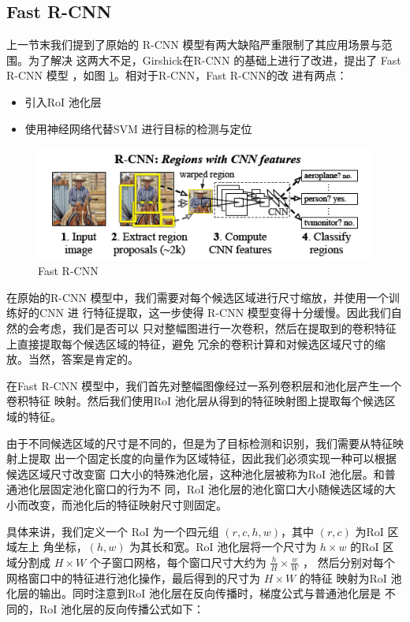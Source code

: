 \subsection{Fast R-CNN}

上一节末我们提到了原始的 R-CNN 模型有两大缺陷严重限制了其应用场景与范围。为了解决
这两大不足，Girshick在R-CNN 的基础上进行了改进，提出了 Fast R-CNN 模型
\cite{Girshick:2015ib}，如图 \ref{Fig:FastRCNN}。相对于R-CNN，Fast R-CNN的改
进有两点：

\begin{itemize}
  \item 引入RoI 池化层
  \item 使用神经网络代替SVM 进行目标的检测与定位
\end{itemize}

\begin{figure}
  \centering
  \includegraphics[width=1.0\linewidth]{./Figure/FastRCNN.png}
  \caption{Fast R-CNN\cite{Girshick:2015ib}}\label{Fig:FastRCNN}
\end{figure}

在原始的R-CNN 模型中，我们需要对每个候选区域进行尺寸缩放，并使用一个训练好的CNN 进
行特征提取，这一步使得 R-CNN 模型变得十分缓慢。因此我们自然的会考虑，我们是否可以
只对整幅图进行一次卷积，然后在提取到的卷积特征上直接提取每个候选区域的特征，避免
冗余的卷积计算和对候选区域尺寸的缩放。当然，答案是肯定的。

在Fast R-CNN 模型中，我们首先对整幅图像经过一系列卷积层和池化层产生一个卷积特征
映射。然后我们使用RoI 池化层从得到的特征映射图上提取每个候选区域的特征。

由于不同候选区域的尺寸是不同的，但是为了目标检测和识别，我们需要从特征映射上提取
出一个固定长度的向量作为区域特征，因此我们必须实现一种可以根据候选区域尺寸改变窗
口大小的特殊池化层，这种池化层被称为RoI 池化层。和普通池化层固定池化窗口的行为不
同，RoI 池化层的池化窗口大小随候选区域的大小而改变，而池化后的特征映射尺寸则固定。


具体来讲，我们定义一个 RoI 为一个四元组 $(r,c,h,w)$，其中 $(r,c)$ 为RoI 区域左上
角坐标，$(h, w)$ 为其长和宽。RoI 池化层将一个尺寸为 $h \times w$ 的RoI 区域分割成
$H \times W$ 个子窗口网格，每个窗口尺寸大约为 $\frac{h}{H} \times \frac{w}{W}$ ，
然后分别对每个网格窗口中的特征进行池化操作，最后得到的尺寸为 $H \times W$ 的特征
映射为RoI 池化层的输出。同时注意到RoI 池化层在反向传播时，梯度公式与普通池化层是
不同的，RoI 池化层的反向传播公式如下：

